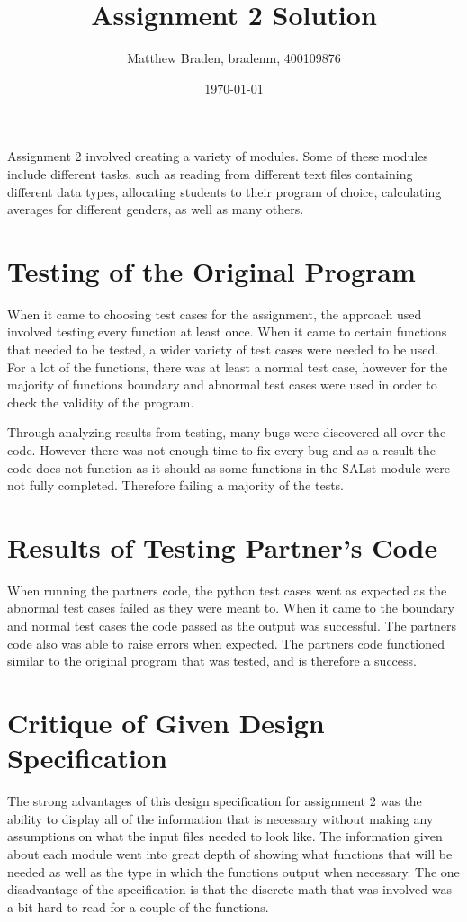 \documentclass[12pt]{article}
\title{Assignment 2 Solution}
\author{Matthew Braden, bradenm, 400109876}
\date{\today}
\begin{document}
\maketitle

Assignment 2 involved creating a variety of modules. Some of these modules include different tasks, such as reading from different text files containing different data types, allocating students to their program of choice, calculating averages for different genders, as well as many others.

\section{Testing of the Original Program}

When it came to choosing test cases for the assignment, the approach used involved testing every function at least once. When it came to certain functions that needed to be tested, a wider variety of test cases were needed to be used. For a lot of the functions, there was at least a normal test case, however for the majority of functions boundary and abnormal test cases were used in order to check the validity of the program.

\medskip

Through analyzing results from testing, many bugs were discovered all over the code. However there was not enough time to fix every bug and as a result the code does not function as it should as some functions in the SALst module were not fully completed. Therefore failing a majority of the tests.

\section{Results of Testing Partner's Code}

When running the partners code, the python test cases went as expected as the abnormal test cases failed as they were meant to. When it came to the boundary and normal test cases the code passed as the output was successful. The partners code also was able to raise errors when expected. The partners code functioned similar to the original program that was tested, and is therefore a success.

\section{Critique of Given Design Specification}

The strong advantages of this design specification for assignment 2 was the ability to display all of the information that is necessary without making any assumptions on what the input files needed to look like. The information given about each module went into great depth of showing what functions that will be needed as well as the type in which the functions output when necessary. The one disadvantage of the specification is that the discrete math that was involved was a bit hard to read for a couple of the functions. 
\end{document}

